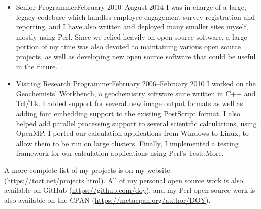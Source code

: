 \documentclass[letterpaper]{article}
\begin{document}
\begin{itemize}
    \item {}
                        {Senior Programmer}{February 2010--August 2014} \vspace{6pt} \linebreak
        \small{I was in charge of a large, legacy codebase which handles employee
        engagement survey registration and reporting, and I have also written
        and deployed many smaller sites myself, mostly using Perl. Since we
        relied heavily on open source software, a large portion of my time was
        also devoted to maintaining various open source projects, as well as
        developing new open source software that could be useful in the
        future.}\normalsize
    \item {}
                        {Visiting Research Programmer}{February 2006--February 2010} \vspace{6pt} \linebreak
        \small{I worked on the Geochemists' Workbench, a geochemistry software suite
        written in C++ and Tcl/Tk. I added support for several new image output
        formats as well as adding font embedding support to the existing
        PostScript format. I also helped add parallel processing support to
        several scientific calculations, using OpenMP. I ported our calculation
        applications from Windows to Linux, to allow them to be run on large
        clusters. Finally, I implemented a testing framework for our calculation
        applications using Perl's Test::More.}\normalsize
\end{itemize}

\small{A more complete list of my projects is on my website
(\url{https://tozt.net/projects.html}). All of my personal open source work is
also available on GitHub (\url{https://github.com/doy}), and my Perl open
source work is also available on the CPAN
(\url{https://metacpan.org/author/DOY}).}\normalsize\vspace{-3pt}
\end{document}
